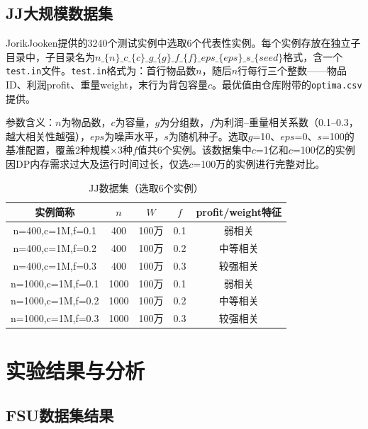 \documentclass[6pt,a4paper]{ctexart}
\begin{document}
\subsection{JJ大规模数据集}

JorikJooken提供的3240个测试实例中选取6个代表性实例。每个实例存放在独立子目录中，子目录名为$n\_\{n\}\_c\_\{c\}\_g\_\{g\}\_f\_\{f\}\_eps\_\{eps\}\_s\_\{seed\}$格式，含一个\texttt{test.in}文件。\texttt{test.in}格式为：首行物品数$n$，随后$n$行每行三个整数——物品ID、利润profit、重量weight，末行为背包容量$c$。最优值由仓库附带的\texttt{optima.csv}提供。

参数含义：$n$为物品数，$c$为容量，$g$为分组数，$f$为利润--重量相关系数（0.1--0.3，越大相关性越强），$eps$为噪声水平，$s$为随机种子。选取$g$=10、$eps$=0、$s$=100的基准配置，覆盖2种规模×3种$f$值共6个实例。该数据集中$c$=1亿和$c$=100亿的实例因DP内存需求过大及运行时间过长，仅选$c$=100万的实例进行完整对比。

\begin{table}[ht]
\centering
\caption{JJ数据集（选取6个实例）}
\begin{tabular}{ccccc}
\toprule
实例简称 & $n$ & $W$ & $f$ & profit/weight特征 \\
\midrule
n=400,c=1M,f=0.1 & 400 & 100万 & 0.1 & 弱相关 \\
n=400,c=1M,f=0.2 & 400 & 100万 & 0.2 & 中等相关 \\
n=400,c=1M,f=0.3 & 400 & 100万 & 0.3 & 较强相关 \\
n=1000,c=1M,f=0.1 & 1000 & 100万 & 0.1 & 弱相关 \\
n=1000,c=1M,f=0.2 & 1000 & 100万 & 0.2 & 中等相关 \\
n=1000,c=1M,f=0.3 & 1000 & 100万 & 0.3 & 较强相关 \\
\bottomrule
\end{tabular}
\end{table}


\section{实验结果与分析}

\subsection{FSU数据集结果}
\end{document}
